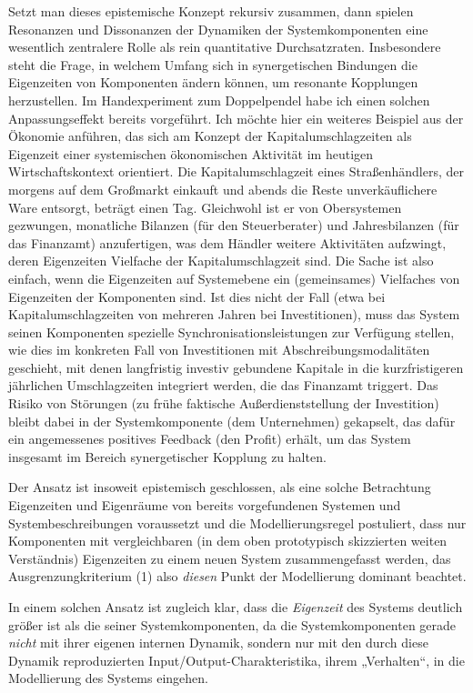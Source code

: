 \documentclass[11pt,a4paper]{article}
\begin{document}
Setzt man dieses epistemische Konzept rekursiv zusammen, dann spielen
Resonanzen und Dissonanzen der Dynamiken der Systemkomponenten eine wesentlich
zentralere Rolle als rein quantitative Durchsatzraten.  Insbesondere steht die
Frage, in welchem Umfang sich in synergetischen Bindungen die Eigenzeiten von
Komponenten ändern können, um resonante Kopplungen herzustellen. Im
Handexperiment zum Doppelpendel habe ich einen solchen Anpassungseffekt
bereits vorgeführt. Ich möchte hier ein weiteres Beispiel aus der Ökonomie
anführen, das sich am Konzept der Kapitalumschlagzeiten als Eigenzeit einer
systemischen ökonomischen Aktivität im heutigen Wirtschaftskontext
orientiert. Die Kapitalumschlagzeit eines Straßenhändlers, der morgens auf dem
Großmarkt einkauft und abends die Reste unverkäuflichere Ware entsorgt,
beträgt einen Tag. Gleichwohl ist er von Obersystemen gezwungen, monatliche
Bilanzen (für den Steuerberater) und Jahresbilanzen (für das Finanzamt)
anzufertigen, was dem Händler weitere Aktivitäten aufzwingt, deren Eigenzeiten
Vielfache der Kapitalumschlagzeit sind. Die Sache ist also einfach, wenn die
Eigenzeiten auf Systemebene ein (gemeinsames) Vielfaches von Eigenzeiten der
Komponenten sind. Ist dies nicht der Fall (etwa bei Kapitalumschlagzeiten von
mehreren Jahren bei Investitionen), muss das System seinen Komponenten
spezielle Synchronisationsleistungen zur Verfügung stellen, wie dies im
konkreten Fall von Investitionen mit Abschreibungsmodalitäten geschieht, mit
denen langfristig investiv gebundene Kapitale in die kurzfristigeren
jährlichen Umschlagzeiten integriert werden, die das Finanzamt triggert. Das
Risiko von Störungen (zu frühe faktische Außerdienststellung der Investition)
bleibt dabei in der Systemkomponente (dem Unternehmen) gekapselt, das dafür
ein angemessenes positives Feedback (den Profit) erhält, um das System
insgesamt im Bereich synergetischer Kopplung zu halten.

Der Ansatz ist insoweit epistemisch geschlossen, als eine solche Betrachtung
Eigenzeiten und Eigenräume von bereits vorgefundenen Systemen und
Systembeschreibungen voraussetzt und die Modellierungsregel postuliert, dass
nur Komponenten mit vergleichbaren (in dem oben prototypisch skizzierten
weiten Verständnis) Eigenzeiten zu einem neuen System zusammengefasst werden,
das Ausgrenzungkriterium (1) also \emph{diesen} Punkt der Modellierung
dominant beachtet.

In einem solchen Ansatz ist zugleich klar, dass die \emph{Eigenzeit} des
Systems deutlich größer ist als die seiner Systemkomponenten, da die
Systemkomponenten gerade \emph{nicht} mit ihrer eigenen internen Dynamik,
sondern nur mit den durch diese Dynamik reproduzierten
Input/Output-Charakteristika, ihrem „Verhalten“, in die Modellierung des
Systems eingehen.
\end{document}
